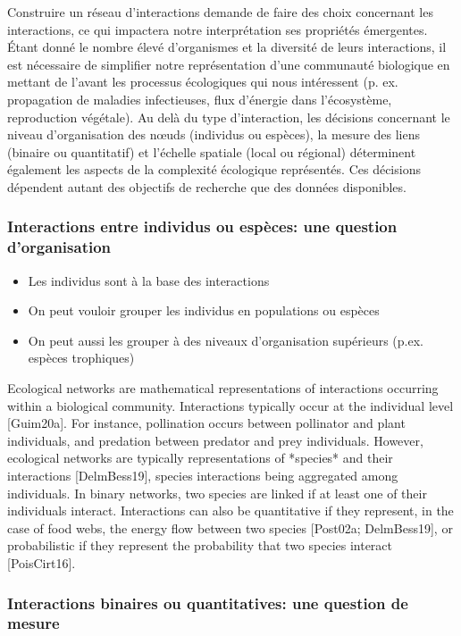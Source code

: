 Construire un réseau d'interactions demande de faire des choix concernant les
interactions, ce qui impactera notre interprétation ses propriétés émergentes.
Étant donné le nombre élevé d'organismes et la diversité de leurs interactions,
il est nécessaire de simplifier notre représentation d'une communauté biologique
en mettant de l'avant les processus écologiques qui nous intéressent (p. ex.
propagation de maladies infectieuses, flux d'énergie dans l'écosystème,
reproduction végétale). Au delà du type d'interaction, les décisions concernant
le niveau d'organisation des nœuds (individus ou espèces), la mesure des liens
(binaire ou quantitatif) et l'échelle spatiale (local ou régional) déterminent
également les aspects de la complexité écologique représentés. Ces décisions
dépendent autant des objectifs de recherche que des données disponibles.

\subsubsection{Interactions entre individus ou espèces: une question d'organisation} 

\begin{itemize}
    \item Les individus sont à la base des interactions
    \item On peut vouloir grouper les individus en populations ou espèces
    \item On peut aussi les grouper à des niveaux d'organisation supérieurs (p.ex. espèces trophiques)
\end{itemize}

Ecological networks are mathematical representations of interactions occurring
within a biological community. Interactions typically occur at the individual
level [Guim20a]. For instance, pollination occurs between pollinator and plant
individuals, and predation between predator and prey individuals. However,
ecological networks are typically representations of *species* and their
interactions [DelmBess19], species interactions being aggregated among
individuals. In binary networks, two species are linked if at least one of their
individuals interact. Interactions can also be quantitative if they represent,
in the case of food webs, the energy flow between two species [Post02a;
DelmBess19], or probabilistic if they represent the probability that two
species interact [PoisCirt16].

\subsubsection{Interactions binaires ou quantitatives: une question de mesure} 

